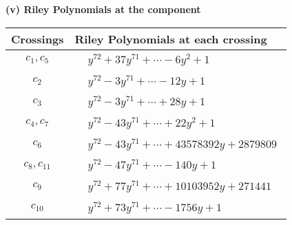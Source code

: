 \documentclass[1p]{elsarticle_modified}
\theoremstyle{definition}
\begin{document}
\newpage\renewcommand{\arraystretch}{1}
\flushleft \textbf{(v) Riley Polynomials at the component}\newline \\
\begin{tabular}{m{50pt}|m{274pt}}
Crossings & \hspace{64pt}Riley Polynomials at each crossing \\
\hline $$\begin{aligned}c_{1},c_{5}\end{aligned}$$&$\begin{aligned}
&y^{72}+37 y^{71}+\cdots-6 y^2+1
\end{aligned}$\\
\hline $$\begin{aligned}c_{2}\end{aligned}$$&$\begin{aligned}
&y^{72}-3 y^{71}+\cdots-12 y+1
\end{aligned}$\\
\hline $$\begin{aligned}c_{3}\end{aligned}$$&$\begin{aligned}
&y^{72}-3 y^{71}+\cdots+28 y+1
\end{aligned}$\\
\hline $$\begin{aligned}c_{4},c_{7}\end{aligned}$$&$\begin{aligned}
&y^{72}-43 y^{71}+\cdots+22 y^2+1
\end{aligned}$\\
\hline $$\begin{aligned}c_{6}\end{aligned}$$&$\begin{aligned}
&y^{72}-43 y^{71}+\cdots+43578392 y+2879809
\end{aligned}$\\
\hline $$\begin{aligned}c_{8},c_{11}\end{aligned}$$&$\begin{aligned}
&y^{72}-47 y^{71}+\cdots-140 y+1
\end{aligned}$\\
\hline $$\begin{aligned}c_{9}\end{aligned}$$&$\begin{aligned}
&y^{72}+77 y^{71}+\cdots+10103952 y+271441
\end{aligned}$\\
\hline $$\begin{aligned}c_{10}\end{aligned}$$&$\begin{aligned}
&y^{72}+73 y^{71}+\cdots-1756 y+1
\end{aligned}$\\
\hline
\end{tabular}\\~\\
\end{document}
